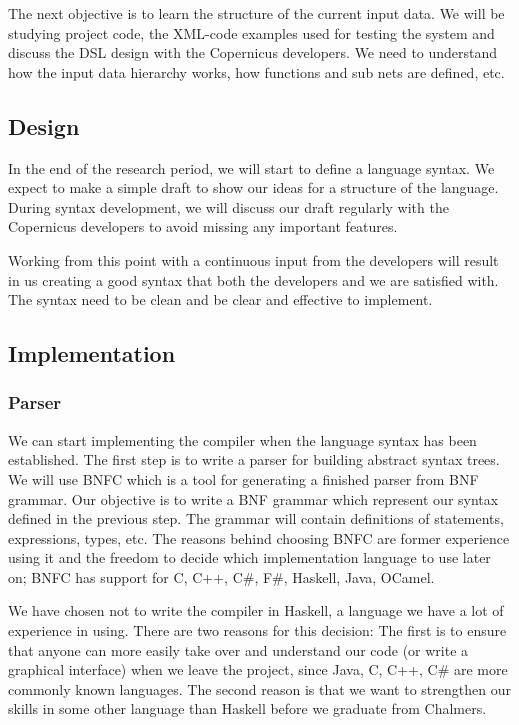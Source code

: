 \documentclass[a4paper]{article}
\begin{document}
The next objective is to learn the structure of the current input
data. We will be studying project code, the XML-code examples used for
testing the system and discuss the DSL design with the Copernicus
developers. We need to understand how the input data hierarchy works,
how functions and sub nets are defined, etc.

\subsection{Design}
In the end of the research period, we will start to define a language
syntax. We expect to make a simple draft to show our ideas for a
structure of the language. During syntax development, we will discuss
our draft regularly with the Copernicus developers to avoid missing
any important features.

Working from this point with a continuous input from the developers
will result in us creating a good syntax that both the developers and
we are satisfied with. The syntax need to be clean and be clear and
effective to implement.

\subsection{Implementation}
\subsubsection{Parser}
We can start implementing the compiler when the language syntax has
been established. The first step is to write a parser for building
abstract syntax trees. We will use BNFC which is a tool for generating
a finished parser from BNF grammar. Our objective is to write a BNF
grammar which represent our syntax defined in the previous step. The
grammar will contain definitions of statements, expressions, types,
etc. The reasons behind choosing BNFC are former experience using it
and the freedom to decide which implementation language to use later
on; BNFC has support for C, C++, C\#, F\#, Haskell, Java, OCamel.

We have chosen not to write the compiler in Haskell, a language we
have a lot of experience in using. There are two reasons for this
decision: The first is to ensure that anyone can more easily take over
and understand our code (or write a graphical interface) when we leave
the project, since Java, C, C++, C\# are more commonly known
languages. The second reason is that we want to strengthen our skills
in some other language than Haskell before we graduate from Chalmers.
\end{document}
